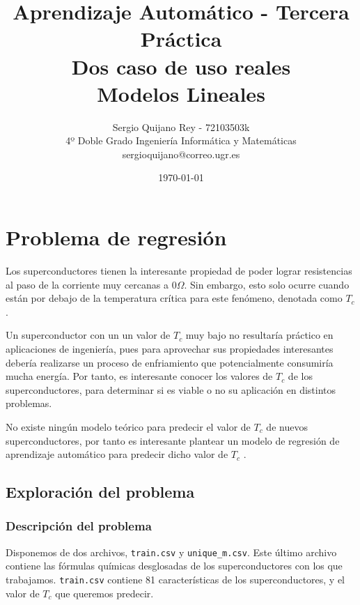 \documentclass[11pt]{article}
\title{
    {Aprendizaje Automático - Tercera Práctica}\\
    {Dos caso de uso reales}\\
    {Modelos Lineales}
}
\author{
    {Sergio Quijano Rey - 72103503k}\\
    {4º Doble Grado Ingeniería Informática y Matemáticas}\\
    {sergioquijano@correo.ugr.es}
}
\date{\today}
\begin{document}
\maketitle
\pagebreak

\tableofcontents

\listoffigures

\listoftables

\pagebreak

\section{Problema de regresión}

Los superconductores tienen la interesante propiedad de poder lograr resistencias al paso de la corriente muy cercanas a $0\Omega$. Sin embargo, esto solo ocurre cuando están por debajo de la temperatura crítica para este fenómeno, denotada como $T_c$.

Un superconductor con un un valor de $T_c$ muy bajo no resultaría práctico en aplicaciones de ingeniería, pues para aprovechar sus propiedades interesantes debería realizarse un proceso de enfriamiento que potencialmente consumiría mucha energía. Por tanto, es interesante conocer los valores de $T_c$ de los superconductores, para determinar si es viable o no su aplicación en distintos problemas.

No existe ningún modelo teórico para predecir el valor de $T_c$ de nuevos superconductores, por tanto es interesante plantear un modelo de regresión de aprendizaje automático para predecir dicho valor de $T_c$ \cite{original_paper_reg:paper}.

\subsection{Exploración del problema}

\subsubsection{Descripción del problema}

Disponemos de dos archivos, \lstinline{train.csv} y \lstinline{unique_m.csv}. Este último archivo contiene las fórmulas químicas desglosadas de los superconductores con los que trabajamos. \lstinline{train.csv} contiene 81 características de los superconductores, y el valor de $T_c$ que queremos predecir.
\end{document}

